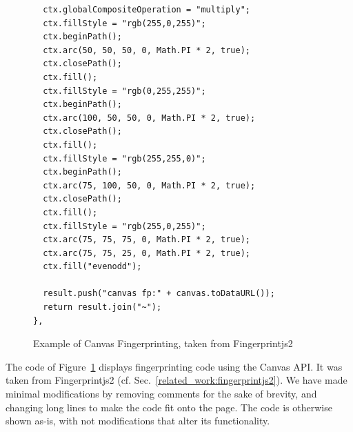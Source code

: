 \documentclass[
    fontsize=12pt,
    headings=small,
    parskip=half,
    bibliography=totoc,
    numbers=noenddot,
    open=any
    ]{scrreprt}
\begin{document}
\begin{appendices}
\begin{figure}
\begin{verbatim}
  ctx.globalCompositeOperation = "multiply";
  ctx.fillStyle = "rgb(255,0,255)";
  ctx.beginPath();
  ctx.arc(50, 50, 50, 0, Math.PI * 2, true);
  ctx.closePath();
  ctx.fill();
  ctx.fillStyle = "rgb(0,255,255)";
  ctx.beginPath();
  ctx.arc(100, 50, 50, 0, Math.PI * 2, true);
  ctx.closePath();
  ctx.fill();
  ctx.fillStyle = "rgb(255,255,0)";
  ctx.beginPath();
  ctx.arc(75, 100, 50, 0, Math.PI * 2, true);
  ctx.closePath();
  ctx.fill();
  ctx.fillStyle = "rgb(255,0,255)";
  ctx.arc(75, 75, 75, 0, Math.PI * 2, true);
  ctx.arc(75, 75, 25, 0, Math.PI * 2, true);
  ctx.fill("evenodd");

  result.push("canvas fp:" + canvas.toDataURL());
  return result.join("~");
},
\end{verbatim}
\caption{Example of Canvas Fingerprinting, taken from Fingerprintjs2}
\label{app:canvas_fp}
\end{figure}

The code of Figure~\ref{app:canvas_fp} displays fingerprinting code
using the Canvas API. It was taken from Fingerprintjs2 (cf. Sec.~\ref{related_work:fingerprintjs2}).
We have made minimal modifications by removing comments for the sake of brevity, and changing
long lines to make the code fit onto the page.
The code is otherwise shown as-is, with not modifications that alter its functionality.



\end{appendices}
\end{document}

